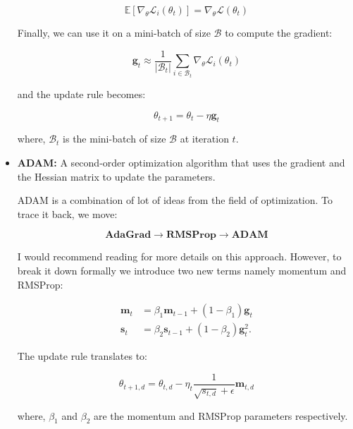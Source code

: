 \begin{itemize}
    \begin{equation}
        \mathbb{E}[\nabla_{\theta} \mathcal{L}_i (\theta_t)] = \nabla_{\theta} \mathcal{L}(\theta_t)
        \label{eq:sgd_unbiased}
    \end{equation}

    Finally, we can use it on a mini-batch of size $\mathcal{B}$ to compute the gradient:

    \begin{equation}
        \textbf{g}_t \approx \frac{1}{|\mathcal{B}_t|} \sum_{i \in \mathcal{B}_t} \nabla_{\theta} \mathcal{L}_i(\theta_t)
        \label{eq:sgd_batch}
    \end{equation}

    and the update rule becomes:

    \begin{equation}
        \theta_{t+1} = \theta_t - \eta \textbf{g}_t
        \label{eq:sgd_batch_update}
    \end{equation}

    where, $\mathcal{B}_t$ is the mini-batch of size $\mathcal{B}$ at iteration $t$.

    \item \textbf{ADAM:} A second-order optimization algorithm that uses the gradient and the Hessian matrix to update the parameters.
    
    ADAM is a combination of lot of ideas from the field of optimization. To trace it back, we move:

    \begin{equation*}
        \textbf{AdaGrad} \rightarrow \textbf{RMSProp} \rightarrow \textbf{ADAM}
    \end{equation*}    

    I would recommend reading \cite{pml1Book} for more details on this approach. However, to break it down formally we introduce two new terms namely momentum and RMSProp:

    \begin{align}
        \textbf{m}_{t} &= \beta_1 \textbf{m}_{t-1} + (1 - \beta_1)\textbf{g}_t \\ 
        \textbf{s}_{t} &= \beta_2 \textbf{s}_{t-1} + (1 - \beta_2)\textbf{g}_t^2.
        \label{eq:adam_m_s}
    \end{align}

    The update rule translates to:
    
    \begin{equation}
        \theta_{t+1, d} = \theta_{t,d} - \eta_t \frac{1}{\sqrt{s_{t,d}} + \epsilon} \textbf{m}_{t, d}
        \label{eq:adam_update}
    \end{equation}

    where, $\beta_1$ and $\beta_2$ are the momentum and RMSProp parameters respectively.

\end{itemize}

